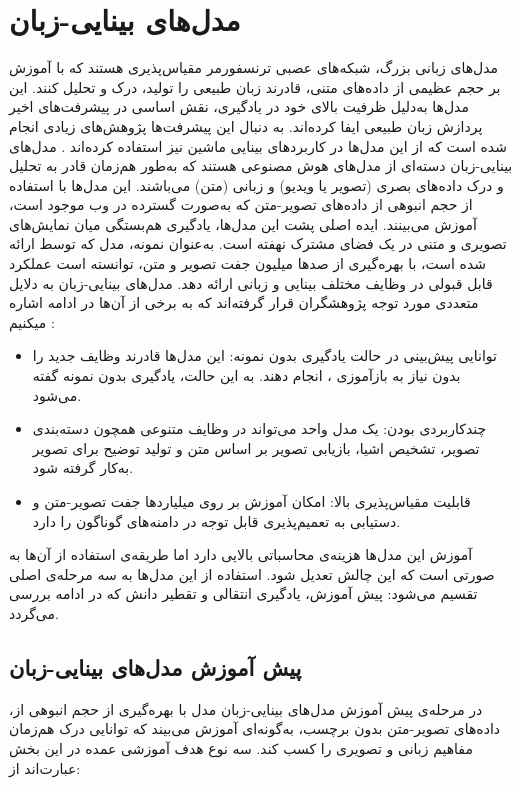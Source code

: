 \section{مدل‌های بینایی-زبان}
مدل‌های زبانی بزرگ، شبکه‌های عصبی ترنسفورمر مقیاس‌پذیری هستند که با آموزش بر حجم عظیمی از داده‌های متنی، قادرند زبان طبیعی را تولید، درک و تحلیل کنند. این مدل‌ها به‌دلیل ظرفیت بالای خود در یادگیری، نقش اساسی در پیشرفت‌های اخیر پردازش زبان طبیعی ایفا کرده‌اند. به دنبال این پیشرفت‌ها پژوهش‌های زیادی انجام شده است که از این مدل‌ها در کاربردهای بینایی ماشین نیز استفاده کرده‌اند
\cite{17}.
مدل‌های بینایی-زبان دسته‌ای از مدل‌های هوش مصنوعی هستند که به‌طور هم‌زمان قادر به تحلیل و درک داده‌های بصری (تصویر یا ویدیو) و زبانی (متن) می‌باشند. این مدل‌ها با استفاده از حجم انبوهی از داده‌های تصویر-متن که به‌صورت گسترده در وب موجود است، آموزش می‌بینند. ایده اصلی پشت این مدل‌ها، یادگیری هم‌بستگی میان نمایش‌های تصویری و متنی در یک فضای مشترک نهفته 
 است.
  به‌عنوان نمونه، مدل 
\cite{clip}
که توسط  ارائه شده است، با بهره‌گیری از صدها میلیون جفت تصویر و متن، توانسته است عملکرد قابل قبولی در وظایف مختلف بینایی و زبانی ارائه دهد.
مدل‌های بینایی-زبان به دلایل متعددی مورد توجه پژوهشگران قرار گرفته‌اند که به برخی از آن‌ها در ادامه اشاره میکنیم
\cite{17}:
\begin{itemize}
\item توانایی پیش‌بینی در حالت یادگیری بدون نمونه:
  این مدل‌ها قادرند وظایف جدید را بدون نیاز به بازآموزی
  ،
   انجام دهند.
 به این حالت، یادگیری بدون نمونه
گفته می‌شود.
\item چندکاربردی بودن:
یک مدل واحد می‌تواند در وظایف متنوعی همچون دسته‌بندی تصویر، تشخیص اشیا، بازیابی تصویر بر اساس متن و تولید توضیح برای تصویر به‌کار گرفته شود.
\item قابلیت مقیاس‌پذیری بالا:
امکان آموزش بر روی میلیاردها جفت تصویر-متن و دستیابی به تعمیم‌پذیری قابل توجه در دامنه‌های گوناگون را دارد.

\end{itemize}
آموزش این مدل‌ها هزینه‌ی محاسباتی بالایی دارد اما طریقه‌ی استفاده از آن‌ها به صورتی است که این چالش تعدیل شود.
استفاده از این مدل‌ها به سه مرحله‌ی اصلی تقسیم می‌شود: پیش آموزش، یادگیری انتقالی و تقطیر دانش که در ادامه بررسی می‌گردد.

\subsection{پیش آموزش مدل‌های بینایی-زبان}
،در مرحله‌ی پیش آموزش مدل‌های بینایی-زبان
مدل با بهره‌گیری از حجم انبوهی از داده‌های تصویر-متن بدون برچسب، به‌گونه‌ای آموزش می‌بیند که توانایی درک هم‌زمان مفاهیم زبانی و تصویری را کسب کند. سه نوع هدف آموزشی عمده در این بخش عبارت‌اند از:

